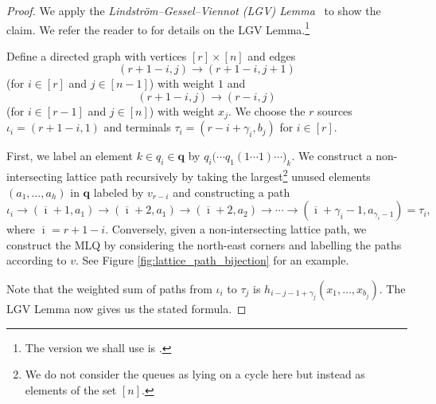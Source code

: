 \documentclass[reqno]{amsart}
\newcommand{\0}{\phantom{c}}
\newcommand{\qq}{\mathbf{q}}
\newcommand{\ive}[1]{\left[ #1 \right]}
\newcommand{\defn}[1]{{\color{darkred}\emph{#1}}} %
\theoremstyle{plain}
\theoremstyle{definition}
\numberwithin{equation}{section}
\begin{document}
\begin{proof}
We apply the \defn{Lindstr\"om--Gessel--Viennot (LGV) Lemma}~\cite{Lindstrom73,GV85} to show the claim.
We refer the reader to \cite[\S2]{GesVie89} for details on the LGV Lemma.\footnote{The version we shall use is \cite[Cor.~2]{GesVie89}.}

Define a directed graph with vertices $\ive{r} \times \ive{n}$ and edges
\[
(r+1-i,j) \to (r+1-i,j+1)
\]
(for $i \in \ive{r}$ and $j \in \ive{n-1}$) with weight $1$ and
\[
(r+1-i,j) \to (r-i,j)
\]
(for $i \in \ive{r-1}$ and $j \in \ive{n}$) with weight $x_j$. 
We choose the $r$ sources $\iota_i = (r+1-i, 1)$ and terminals $\tau_i = (r-i+\gamma_i,b_j)$ for $i \in \ive{r}$.

First, we label an element $k \in q_i \in \qq$ by $q_i\bigl( \cdots q_1(1 \cdots 1) \cdots \bigr)_k$.
We construct a non-intersecting lattice path recursively by taking the largest\footnote{We do not consider the queues as lying on a cycle here but instead as elements of the set $\ive{n}$.} unused elements $(a_1, \dotsc, a_h)$ in $\qq$ labeled by $v_{r-i}$ and constructing a path
\newcommand{\patharrow}{ \xrightarrow{\hspace{10pt}} }
\[
\iota_i \patharrow (\overline{\imath} + 1, a_1) \patharrow (\overline{\imath} + 2, a_1) \patharrow (\overline{\imath} + 2, a_2) \patharrow \cdots \patharrow (\overline{\imath} + \gamma_i - 1, a_{\gamma_i - 1}) = \tau_i,
\]
where $\overline{\imath} = r + 1 - i$.
Conversely, given a non-intersecting lattice path, we construct the MLQ by considering the north-east corners and labelling the paths according to $v$.
See Figure \ref{fig:lattice_path_bijection} for an example.

Note that the weighted sum of paths from $\iota_i$ to $\tau_j$ is $h_{i-j-1+\gamma_j}(x_1, \dotsc, x_{b_j})$.
The LGV Lemma now gives us the stated formula.
\end{proof}
\end{document}
